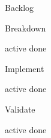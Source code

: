 \documentclass[landscape]{extreport}
\begin{document}
\vspace*{5cm}

\begin{center}
    {\fontsize{160}{100}\selectfont Backlog}
\end{center}
\newpage

\vspace*{5cm}

\begin{center}
    {\fontsize{160}{100}\selectfont Breakdown}
\end{center}
\vspace*{5cm}

{\fontsize{60}{100}\selectfont active}
\hfill
{\fontsize{60}{100}\selectfont done}


\newpage

\vspace*{5cm}

\begin{center}
    {\fontsize{160}{100}\selectfont Implement}
\end{center}
\vspace*{5cm}

{\fontsize{60}{100}\selectfont active}
\hfill
{\fontsize{60}{100}\selectfont done}


\newpage

\vspace*{5cm}

\begin{center}
    {\fontsize{160}{100}\selectfont Validate}
\end{center}
\vspace*{5cm}

{\fontsize{60}{100}\selectfont active}
\hfill
{\fontsize{60}{100}\selectfont done}
\end{document}
